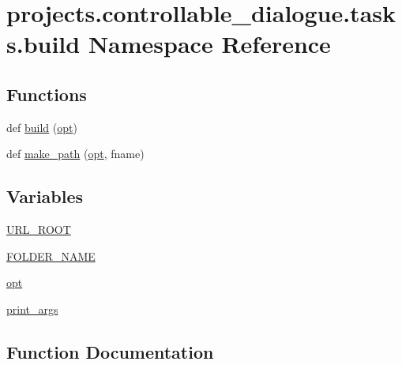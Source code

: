 \hypertarget{namespaceprojects_1_1controllable__dialogue_1_1tasks_1_1build}{}\section{projects.\+controllable\+\_\+dialogue.\+tasks.\+build Namespace Reference}
\label{namespaceprojects_1_1controllable__dialogue_1_1tasks_1_1build}
\subsection*{Functions}
\begin{DoxyCompactItemize}
\item 
def \hyperlink{namespaceprojects_1_1controllable__dialogue_1_1tasks_1_1build_a81362ba81ea151eaa905d59ec129291f}{build} (\hyperlink{namespaceprojects_1_1controllable__dialogue_1_1tasks_1_1build_aff2d50a83bc83a9f5f82bca82737fec2}{opt})
\item 
def \hyperlink{namespaceprojects_1_1controllable__dialogue_1_1tasks_1_1build_a4ad8db760a5f21fd2efa3e09b47a0ec9}{make\+\_\+path} (\hyperlink{namespaceprojects_1_1controllable__dialogue_1_1tasks_1_1build_aff2d50a83bc83a9f5f82bca82737fec2}{opt}, fname)
\end{DoxyCompactItemize}
\subsection*{Variables}
\begin{DoxyCompactItemize}
\item 
\hyperlink{namespaceprojects_1_1controllable__dialogue_1_1tasks_1_1build_a48accd28e7fcfa8d0aa47c27043c780c}{U\+R\+L\+\_\+\+R\+O\+OT}
\item 
\hyperlink{namespaceprojects_1_1controllable__dialogue_1_1tasks_1_1build_a30f40f900104e4d15e8f5bae96e3d2de}{F\+O\+L\+D\+E\+R\+\_\+\+N\+A\+ME}
\item 
\hyperlink{namespaceprojects_1_1controllable__dialogue_1_1tasks_1_1build_aff2d50a83bc83a9f5f82bca82737fec2}{opt}
\item 
\hyperlink{namespaceprojects_1_1controllable__dialogue_1_1tasks_1_1build_aaf9c6056a355c387d96a033f4633f673}{print\+\_\+args}
\end{DoxyCompactItemize}


\subsection{Function Documentation}
\mbox{\label{namespaceprojects_1_1controllable__dialogue_1_1tasks_1_1build_a81362ba81ea151eaa905d59ec129291f}} 
